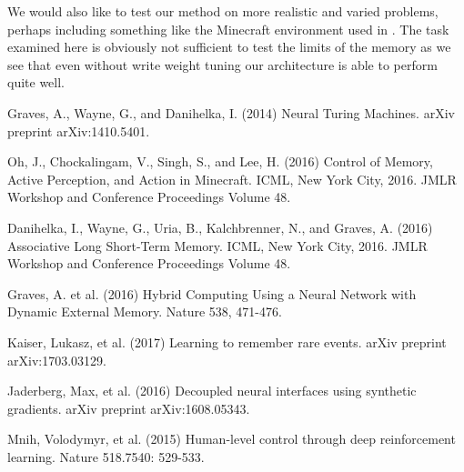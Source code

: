 \documentclass{article}
\begin{document}
We would also like to test our method on more realistic and varied problems, perhaps including something like the Minecraft environment used in \cite{MC}. The task examined here is obviously not sufficient to test the limits of the memory as we see that even without write weight tuning our architecture is able to perform quite well.


\begin{thebibliography}{plain}
Graves, A., Wayne, G., and Danihelka, I. (2014) Neural Turing Machines. arXiv preprint arXiv:1410.5401.

Oh, J., Chockalingam, V., Singh, S., and Lee, H. (2016) Control of Memory, Active Perception, and Action in Minecraft. ICML, New York City, 2016. JMLR Workshop and Conference Proceedings Volume 48.

Danihelka, I., Wayne, G., Uria, B., Kalchbrenner, N., and Graves, A. (2016) Associative Long Short-Term Memory. ICML, New York City, 2016. JMLR Workshop and Conference Proceedings Volume 48.

Graves, A. et al. (2016) Hybrid Computing Using a Neural Network with Dynamic External Memory. Nature 538, 471-476.

Kaiser, Lukasz, et al. (2017) Learning to remember rare events. arXiv preprint arXiv:1703.03129.

Jaderberg, Max, et al. (2016) Decoupled neural interfaces using synthetic gradients. arXiv preprint arXiv:1608.05343.

Mnih, Volodymyr, et al. (2015) Human-level control through deep reinforcement learning. Nature 518.7540: 529-533.
\end{thebibliography}
\end{document}
